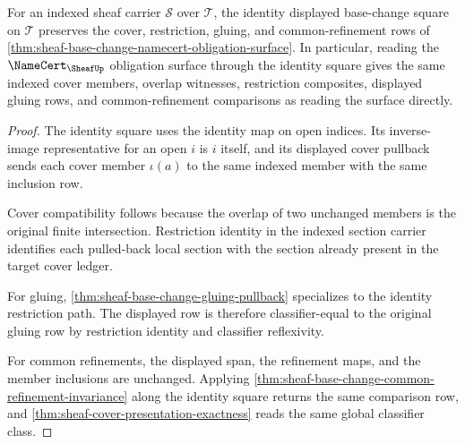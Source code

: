 \begin{theorem}
\label{thm:sheaf-base-change-identity-square-neutrality}
For an indexed sheaf carrier $\mathcal{S}$ over $\mathcal{T}$, the identity displayed base-change square on $\mathcal{T}$ preserves the cover, restriction, gluing, and common-refinement rows of \autoref{thm:sheaf-base-change-namecert-obligation-surface}. In particular, reading the $\NameCert_{\SheafUp}$ obligation surface through the identity square gives the same indexed cover members, overlap witnesses, restriction composites, displayed gluing rows, and common-refinement comparisons as reading the surface directly.
\end{theorem}
\begin{proof}
The identity square uses the identity map on open indices. Its inverse-image representative for an open $i$ is $i$ itself, and its displayed cover pullback sends each cover member $\iota(a)$ to the same indexed member with the same inclusion row.

Cover compatibility follows because the overlap of two unchanged members is the original finite intersection. Restriction identity in the indexed section carrier identifies each pulled-back local section with the section already present in the target cover ledger.

For gluing, \autoref{thm:sheaf-base-change-gluing-pullback} specializes to the identity restriction path. The displayed row is therefore classifier-equal to the original gluing row by restriction identity and classifier reflexivity.

For common refinements, the displayed span, the refinement maps, and the member inclusions are unchanged. Applying \autoref{thm:sheaf-base-change-common-refinement-invariance} along the identity square returns the same comparison row, and \autoref{thm:sheaf-cover-presentation-exactness} reads the same global classifier class.
\end{proof}

